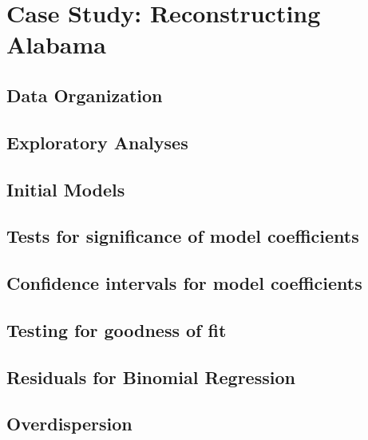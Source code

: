\documentclass[
]{krantz}
\begin{document}
\hypertarget{case-study-reconstructing-alabama}{%
\section{Case Study: Reconstructing Alabama}\label{case-study-reconstructing-alabama}}

\hypertarget{data-organization-3}{%
\subsection{Data Organization}\label{data-organization-3}}

\hypertarget{exploratory-analyses}{%
\subsection{Exploratory Analyses}\label{exploratory-analyses}}

\hypertarget{initial-models-1}{%
\subsection{Initial Models}\label{initial-models-1}}

\hypertarget{sec-logisticInf}{%
\subsection{Tests for significance of model coefficients}\label{sec-logisticInf}}

\hypertarget{confidence-intervals-for-model-coefficients}{%
\subsection{Confidence intervals for model coefficients}\label{confidence-intervals-for-model-coefficients}}

\hypertarget{testing-for-goodness-of-fit}{%
\subsection{Testing for goodness of fit}\label{testing-for-goodness-of-fit}}

\hypertarget{residuals-for-binomial-regression}{%
\subsection{Residuals for Binomial Regression}\label{residuals-for-binomial-regression}}

\hypertarget{sec-logOverdispersion}{%
\subsection{Overdispersion}\label{sec-logOverdispersion}}
\end{document}
